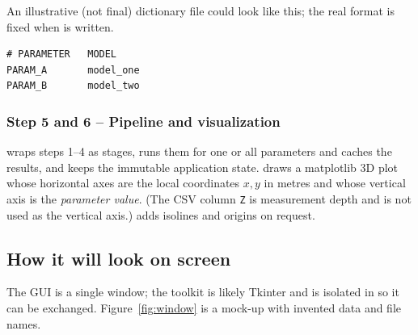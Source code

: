\documentclass{article}
\begin{document}
An illustrative (not final) dictionary file could look like this; the real
format is fixed when  is written.

\begin{lstlisting}
# PARAMETER   MODEL
PARAM_A       model_one
PARAM_B       model_two
\end{lstlisting}

\subsubsection*{Step 5 and 6 -- Pipeline and visualization}
\label{sec:viz}

 wraps steps 1--4 as stages,  runs them
for one or all parameters and caches the results, and  keeps
the immutable application state.  draws a matplotlib 3D
plot whose horizontal axes are the local coordinates $x,y$ in metres and
whose vertical axis is the \emph{parameter value}. (The CSV column \texttt{Z}
is measurement depth and is not used as the vertical axis.)
 adds isolines and origins on request.

\subsection{How it will look on screen}
\label{sec:screens}

The GUI is a single window; the toolkit is likely Tkinter and is isolated in
 so it can be exchanged. Figure~\ref{fig:window} is a mock-up with
invented data and file names.
\end{document}
